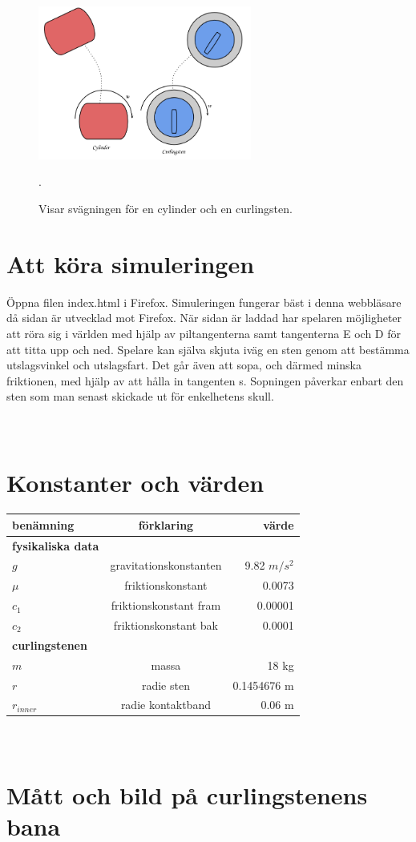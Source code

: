 \documentclass[11pt]{article} %
\begin{document}
\begin{figure}[ht!]
\centering
\includegraphics[width=70mm]{curl.png}
\caption{Visar svägningen för en cylinder och en curlingsten. }.
\label{fig:curl}
\label{overflow}
\end{figure}

\section{Att köra simuleringen}
Öppna filen index.html i Firefox. Simuleringen fungerar bäst i denna webbläsare då sidan är utvecklad mot Firefox. När sidan är laddad har spelaren möjligheter att röra sig i världen med hjälp av piltangenterna samt tangenterna E och D för att titta upp och ned. Spelare kan själva skjuta iväg en sten genom att bestämma utslagsvinkel och utslagsfart. Det går även att sopa, och därmed minska friktionen, med hjälp av att hålla in tangenten s. Sopningen påverkar enbart den sten som man senast skickade ut för enkelhetens skull. 


\appendix
\section{\\Konstanter och värden} \label{App:AppendixA}


\begin{tabular}{l | c | r}
benämning & förklaring & värde \\ \hline\hline
\textbf{fysikaliska data} & & \\ \hline
$g$ & gravitationskonstanten & 9.82 $m/s^2$\\
$\mu$ & friktionskonstant & 0.0073\\
$c_1$ & friktionskonstant fram & 0.00001\\
$c_2$ & friktionskonstant bak & 0.0001\\
\textbf{curlingstenen} & & \\ \hline
$m$ & massa & 18 kg\\
$r$ & radie sten & 0.1454676 m\\
$r_{inner}$ & radie kontaktband & 0.06 m\\ \hline
\end{tabular}

\section{\\Mått och bild på curlingstenens bana} \label{App:AppendixB}
\end{document}
